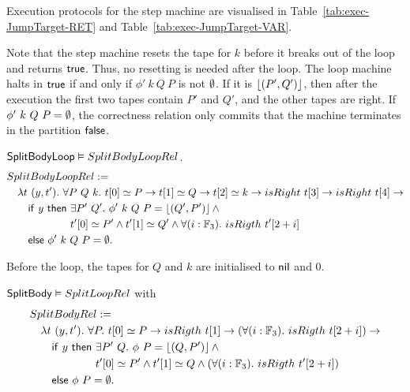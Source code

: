 Execution protocols for the step machine are visualised in Table~\ref{tab:exec-JumpTarget-RET} and Table~\ref{tab:exec-JumpTarget-VAR}.

Note that the step machine resets the tape for $k$ before it breaks out of the loop and returns $\mathsf{true}$.  Thus, no resetting is needed after the loop.
The loop machine halts in $\mathsf{true}$ if and only if $\phi'~k~Q~P$ is not $\emptyset$.  If it is $\left\lfloor {(P',Q')} \right\rfloor$, then after the execution the first two
tapes contain $P'$ and $Q'$, and the other tapes are right.  If $\phi'~k~Q~P = \emptyset$, the correctness relation only commits that the machine
terminates in the partition $\mathsf{false}$.
\begin{lemma}
  $\mathsf{SplitBodyLoop} \mathrel{\vDash} SplitBodyLoopRel$.
  \begin{alignat*}{1}
    & SplitBodyLoopRel := \\
    &\quad \lambda t~(y, t').~\forall P~Q~k.~t[0] \simeq P \rightarrow t[1] \simeq Q \rightarrow t[2] \simeq k \rightarrow isRight~t[3] \rightarrow isRight~t[4] \rightarrow \\
    &\quad\quad \MS{if}~y~\MS{then}~\exists P'~Q'.~ \phi'~k~Q~P = \Some{(Q', P')} \land \\
    &\quad\quad \phantom{\MS{if}~y~\MS{then}}~t'[0] \simeq P' \land t'[1] \simeq Q' \land \forall(i:\Fin_3).~isRigth~t'[2+i] \\
    &\quad\quad \MS{else}~\phi'~k~Q~P=\None.
\end{alignat*}
\end{lemma}

Before the loop, the tapes for $Q$ and $k$ are initialised to $\mathsf{nil}$ and $0$.
\begin{lemma}
  $\mathsf{SplitBody} \mathrel{\vDash} SplitLoopRel$ with
  \begin{alignat*}{1}
    & SplitBodyRel := \\
    &\quad \lambda t~(y, t').~\forall P.~t[0] \simeq P \rightarrow isRigth~t[1] \rightarrow (\forall(i:\Fin_3).~isRigth~t[2+i]) \rightarrow \\
    &\quad\quad \MS{if}~y~\MS{then}~\exists P'~Q.~ \phi~P = \Some{(Q, P')} \land \\
    &\quad\quad \phantom{\MS{if}~y~\MS{then}}~t'[0] \simeq P' \land t'[1] \simeq Q \land \left(\forall(i:\Fin_3).~isRigth~t'[2+i]\right) \\
    &\quad\quad \MS{else}~\phi~P=\None.
\end{alignat*}
\end{lemma}


